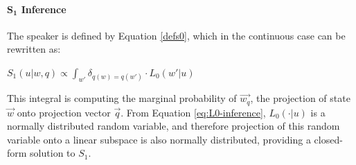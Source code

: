 \documentclass[9pt,twocolumn,twoside,lineno]{pnas-new}
\begin{document}
{	%








\paragraph{$\mathbf{S_1}$ Inference}
		The speaker is defined by Equation \ref{defs0}, which in the continuous case can be rewritten as:
		\begin{examples}
		\item $S_1(u\vert w,q) \propto \int_{w'} \delta_{q(w)=q(w')} \cdot L_0(w'\vert u)$
		\end{examples}
		This integral is computing the marginal probability of $\overrightarrow{w_q}$, the projection of state $\overrightarrow{w}$ onto projection vector $\overrightarrow{q}$. From Equation \ref{eq:L0-inference}, $L_0(\cdot \vert u)$ is a normally distributed random variable, and therefore projection of this random variable onto a linear subspace is also normally distributed, providing a closed-form solution to $S_1$.




}
\end{document}
